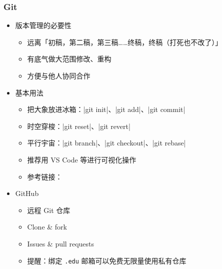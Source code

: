 \begin{frame}[fragile]
\frametitle{Git}
\begin{itemize}
  \item<+-> 版本管理的必要性

    \begin{itemize}
      \item 远离「初稿，第二稿，第三稿……终稿，终稿（打死也不改了）」
      \item 有底气做大范围修改、重构
      \item 方便与他人协同合作
    \end{itemize}

  \item<+-> 基本用法

    \begin{itemize}
      \item 把大象放进冰箱：|git init|、|git add|、|git commit|
      \item 时空穿梭：|git reset|、|git revert|
      \item 平行宇宙：|git branch|、|git checkout|、|git rebase|
      \item 推荐用 VS Code 等进行可视化操作
      \item 参考链接：
    \end{itemize}

  \item<+-> GitHub \href{https://github.com}{\faGithub}

    \begin{itemize}
      \item 远程 Git 仓库
      \item Clone \& fork
      \item Issues \& pull requests
      \item<+-> \alert{提醒：绑定 \texttt{.edu} 邮箱可以免费无限量使用私有仓库}
    \end{itemize}
\end{itemize}
\end{frame}

